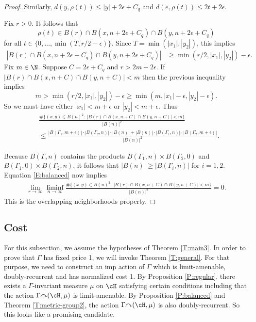 \documentclass[12pt]{article}
\theoremstyle{plain}
\theoremstyle{definition}
\theoremstyle{remark}
\newcommand{\G}{\Gamma}
\newcommand{\eps}{\epsilon}
\def\cc{{\curvearrowright}}
\begin{document}
\begin{proof}
  Similarly, $d(y,\rho(t)) \le  |y| + 2\eps+C_q$ and $d(e,\rho(t)) \le 2t+2\eps$.
  
Fix $r>0$. It follows that
$$\rho(t) \in B(r)\cap B(x,n+2\eps+C_q)\cap B(y,n+2\eps+C_q) $$
for all $t \in \{0,\ldots, \min(T,r/2-\eps)\}$. Since $T=\min(|x_1|,|y_2|)$,  this implies
\begin{align*}
    |B(r)\cap B(x,n+2\eps+C_q)\cap B(y,n+2\eps+C_q) | &\ge \min(r/2, |x_1|, |y_2|) - \eps.
\end{align*}
Fix $m\in \N$. Suppose $C=2\eps+C_q$ and $r>2m+2\eps$. If $|B(r) \cap B(x,n+C) \cap B(y,n+C)| < m$ then the previous inequality implies 
$$m>\min(r/2, |x_1|, |y_2|) - \eps\ge \min(m, |x_1|-\eps, |y_2|-\eps).$$
So we must have either $|x_1|<m+\eps$ or $|y_2|<m+\eps$. Thus
   \begin{align*}
& \frac{\#\{(x,y) \in B(n)^2:~|B(r) \cap B(x,n+C) \cap B(y,n+C)| < m\}}{|B(n)|^2}\\
&\le  \frac{|B(\G_1,m+\eps)|\cdot |B(\G_2,n)|\cdot |B(n)| + |B(n)| \cdot |B(\G_1,n)| \cdot|B(\G_2,m+\eps)| }{|B(n)|^2}.
\end{align*}

Because $B(\G,n)$ contains the products $B(\G_1,n)\times B(\G_2,0)$ and $B(\G_1,0)\times B(\G_2,n)$, it follows that $|B(n)|\ge |B(\G_i,n)|$ for $i=1,2$. Equation \ref{E:balanced} now implies
\begin{align*}
    \lim_{r\to\infty} \liminf_{n\to\infty}  \frac{\#\{(x,y) \in B(n)^2:~|B(r) \cap B(x,n+C) \cap B(y,n+C)| < m\}}{|B(n)|^2} =0.
\end{align*}
This is the overlapping neighborhoods property.
\end{proof}

\subsection{Cost}

For this subsection, we assume the hypotheses of Theorem \ref{T:main3}. In order to prove that $\G$ has fixed price 1, we will invoke Theorem \ref{T:general}. For that purpose, we need to construct an imp action of $\G$ which is limit-amenable, doubly-recurrent and has normalized cost 1. By Proposition \ref{P:regular}, there exists a $\G$-invariant measure $\mu$ on $\cH$ satisfying certain conditions including that the action $\G \cc (\cH,\mu)$ is limit-amenable. By Proposition \ref{P:balanced} and Theorem \ref{T:metric-group2}, the action $\G \cc (\cH,\mu)$ is also doubly-recurrent. So this looks like a promising candidate.
\end{document}
